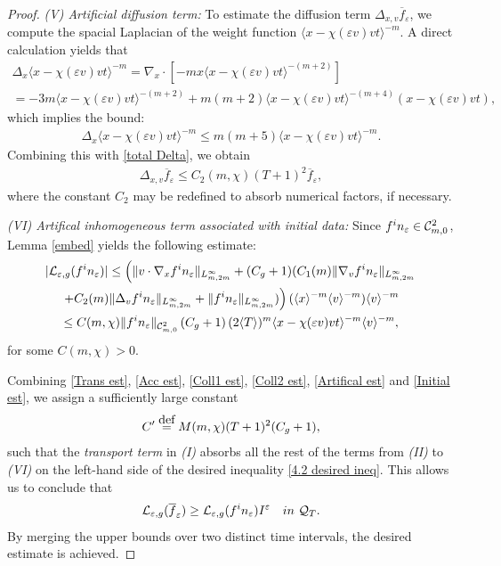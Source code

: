 \documentclass[10pt,a4paper]{amsart}
\newcommand{\eqdef }{\overset{\mbox{\tiny{def}}}{=}}
\begin{document}
\begin{proof}
\noindent \textit{(V) Artificial diffusion term:} To estimate the diffusion term $\Delta_{x,v}\overline{f}_\varepsilon$, we compute the spacial Laplacian of the weight function $\langle x-\chi(\varepsilon v)vt\rangle^{-m}$. A direct calculation yields that
\begin{multline*}
\Delta_x\langle x-\chi(\varepsilon v)vt\rangle^{-m} = \nabla_x\cdot[-mx\langle x-\chi(\varepsilon v)vt\rangle^{-(m+2)}]\\
= -3m\langle x-\chi(\varepsilon v)vt\rangle^{-(m+2)} +m(m+2)\langle x-\chi(\varepsilon v)vt\rangle^{-(m+4)}(x-\chi(\varepsilon v)vt),
\end{multline*}which implies the bound:
\begin{align*}
\Delta_x\langle x-\chi(\varepsilon v)vt\rangle^{-m} \le m(m+5)\langle x-\chi(\varepsilon v)vt\rangle^{-m}.
\end{align*}Combining this with  \eqref{total Delta}, we obtain
\begin{align}\label{Artifical est}
\Delta_{x,v}\overline{f}_\varepsilon \le C_2(m,\chi)(T+1)^2\overline{f}_\varepsilon,
\end{align}where the constant $C_2$ may be redefined to absorb numerical factors, if necessary. 

\noindent \textit{(VI) Artifical inhomogeneous term associated with initial data:} Since $f^\textup{in}_\varepsilon\in \mathcal{C}^2_{m,0}$, Lemma \ref{embed} yields the following estimate:
\begin{multline}\label{Initial est}
|\mathcal{L}_{\varepsilon,g}(f^\textup{in}_\varepsilon)| \le
\left(\lVert v\cdot\nabla_xf^\textup{in}_\varepsilon\rVert_{L^\infty_{m,2m}} + (C_g+1)(C_1(m) \lVert \nabla_vf^\textup{in}_\varepsilon\rVert_{L^\infty_{m,2m}}\right. \\
\left.+ C_2(m) \lVert \Delta_{v} f^\textup{in}_\varepsilon\rVert_{L^\infty_{m,2m}} + \lVert f^\textup{in}_\varepsilon\rVert_{L^\infty_{m,2m}})\right) (\langle x\rangle^{-m}\langle v\rangle^{-m})\langle v\rangle^{-m}\\
\le C(m,\chi)\lVert f^\textup{in}_\varepsilon\rVert_{\mathcal{C}^2_{m,0}}\left(C_g+1\right) (2\langle T\rangle)^m \langle x-\chi(\varepsilon v)vt\rangle^{-m}\langle v\rangle^{-m},
\end{multline}for some $C(m,\chi)>0.$

Combining \eqref{Trans est}, \eqref{Acc est}, \eqref{Coll1 est}, \eqref{Coll2 est}, \eqref{Artifical est} and \eqref{Initial est}, we assign a sufficiently large constant 
\begin{align}\label{final C'}
C' \eqdef M(m,\chi)(T+1)^2(C_g+1),
\end{align} such that the \textit{transport term} in \textit{(I)} absorbs all the rest of the terms from \textit{(II)} to \textit{(VI)} on the left-hand side of the desired inequality \eqref{4.2 desired ineq}. This allows us to conclude that
\begin{align*}
\mathcal{L}_{\varepsilon,g}(\overline{f}_\varepsilon) \ge \mathcal{L}_{\varepsilon,g}(f^\textup{in}_\varepsilon)I^\varepsilon \quad \textup{ in }\,\, \mathcal{Q}_T.
\end{align*}
By merging the upper bounds over two distinct time intervals, the desired estimate is achieved.


\end{proof}
\end{document}
